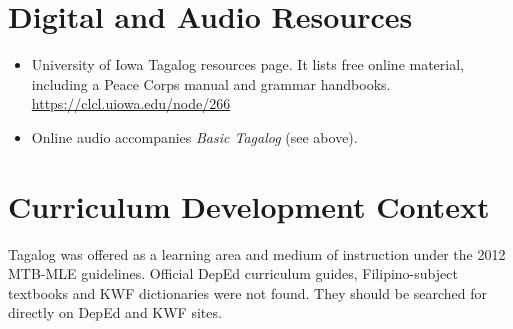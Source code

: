 \documentclass[12pt]{article}
\begin{document}
\section{Digital and Audio Resources}
\begin{itemize}
\item University of Iowa Tagalog resources page. It lists free online material, including a Peace Corps manual and grammar handbooks. \url{https://clcl.uiowa.edu/node/266}
\item Online audio accompanies \emph{Basic Tagalog} (see above).
\end{itemize}
\section{Curriculum Development Context}
Tagalog was offered as a learning area and medium of instruction under the 2012 MTB-MLE guidelines. Official DepEd curriculum guides, Filipino-subject textbooks and KWF dictionaries were not found. They should be searched for directly on DepEd and KWF sites.
\end{document}

